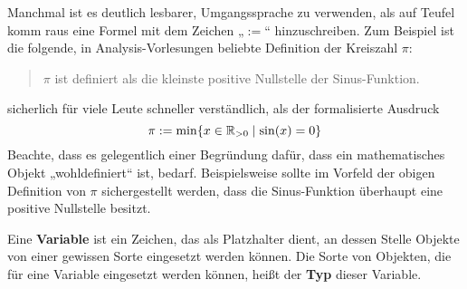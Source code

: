 \begin{nota}
    Manchmal ist es deutlich lesbarer, Umgangssprache zu verwenden, als auf Teufel komm raus eine Formel mit dem Zeichen „$:=$“ hinzuschreiben. Zum Beispiel ist die folgende, in Analysis-Vorlesungen beliebte Definition der Kreiszahl $\pi$:
    \begin{quote}
        $\pi$ ist definiert als die kleinste positive Nullstelle der Sinus-Funktion.
    \end{quote}
    sicherlich für viele Leute schneller verständlich, als der formalisierte Ausdruck
    \[ \pi := \min \{ x\in \mathbb R_{>0} \mid \sin(x)=0\} \]
    Beachte, dass es gelegentlich einer Begründung dafür, dass ein mathematisches Objekt „wohldefiniert“ ist, bedarf. Beispielsweise sollte im Vorfeld der obigen Definition von $\pi$ sichergestellt werden, dass die Sinus-Funktion überhaupt eine positive Nullstelle besitzt.
\end{nota}


\begin{de}[Variable] \label{def:variable}  
    Eine \textbf{Variable} ist ein Zeichen, das als Platzhalter dient, an dessen Stelle Objekte von einer gewissen Sorte eingesetzt werden können. Die Sorte von Objekten, die für eine Variable eingesetzt werden können, heißt der \textbf{Typ} dieser Variable.
\end{de}


